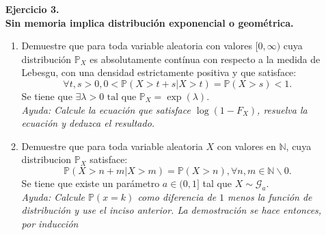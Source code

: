 \documentclass[12pt,a4paper]{article}
\newcommand{\N}{\mathbb{N}}
\newcommand{\tq}{\text{ tal que }}
\begin{document}
\begin{enumerate}
\begin{enumerate}
 		\end{enumerate}
 		
 		
 		\item[\textbf{Ejercicio 3.}]
 		$\;$\\
 		\textbf{Sin memoria implica distribución exponencial o geométrica.}
 		\begin{enumerate}
 			\item Demuestre que para toda variable aleatoria con valores $[0,\infty)$ cuya distribución $\mathbb{P}_X$ es absolutamente contínua con respecto a la medida de Lebesgu, con una densidad estrictamente positiva y que satisface:
 			$$\forall t,s>0, 0< \mathbb{P}(X>t+s\vert X>t)=\mathbb{P}(X>s)<1.$$
 			Se tiene que $\exists \lambda >0 \tq \mathbb{P}_X=\exp(\lambda)$.
 			\\ \textit{Ayuda: Calcule la ecuación que satisface $\log(1-F_X)$, resuelva la ecuación y deduzca el resultado.}
 			\item Demuestre que para toda variable aleatoria $X$ con valores en $\N$, cuya distribucion $\mathbb{P}_X$ satisface:
 			$$\mathbb{P}(X>n+m\vert X>m)=\mathbb{P}(X>n), \forall n,m \in \N\backslash{0}.$$
 			Se tiene que existe un parámetro $a \in (0,1]$ tal que $X \sim \mathcal{G}_a$.
 			\\
 			\textit{Ayuda: Calcule $\mathbb{P} (x = k)$ como diferencia de $1$ menos la función de distribución y use el inciso anterior. La demostración se hace entonces, por inducción}
 			
 			
 		\end{enumerate}
 		
 		\end{enumerate}
 
\end{document}
